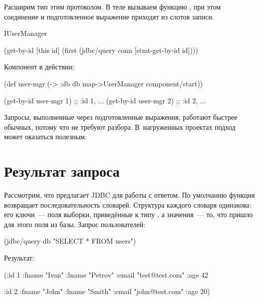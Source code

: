 Расширим тип  этим протоколом. В теле  вызываем функцию , при этом соединение и подготовленное выражение приходят из слотов записи.

\begin{english}
  \begin{clojure}
IUserManager

(get-by-id [this id]
  (first
    (jdbc/query conn [stmt-get-by-id id])))
  \end{clojure}
\end{english}

Компонент в действии:

\begin{english}
  \begin{clojure}
(def user-mgr
  (-> {:db db}
      map->UserManager
      component/start))

(get-by-id user-mgr 1) ;; {:id 1, ...}
(get-by-id user-mgr 2) ;; {:id 2, ...}
  \end{clojure}
\end{english}

Запросы, выполненные через подготовленные выражения, работают быстрее обычных, потому что не требуют разбора. В~нагруженных проектах подход может оказаться полезным.

\section{Результат запроса}

Рассмотрим, что предлагает JDBC для работы с ответом. По умолчанию функция  возвращает последовательность словарей. Структура каждого словаря одинакова: его ключи~--- поля выборки, приведённые к типу , а значения~--- то, что пришло для этого поля из базы. Запрос пользователей:

\begin{english}
  \begin{clojure}
(jdbc/query db "SELECT * FROM users")
  \end{clojure}
\end{english}

Результат:

\begin{english}
  \begin{clojure}
({:id 1
  :fname "Ivan"
  :lname "Petrov"
  :email "test@test.com"
  :age 42}

 {:id 2
  :fname "John"
  :lname "Smith"
  :email "john@test.com"
  :age 20})
  \end{clojure}
\end{english}

